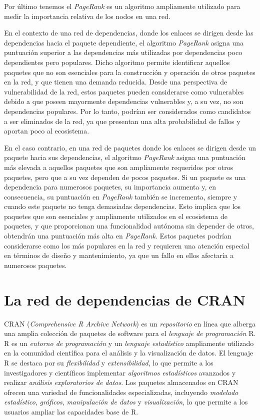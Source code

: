 Por último tenemos el \emph{PageRank} es un algoritmo ampliamente utilizado para medir la importancia relativa
de los nodos en una red.

En el contexto de una red de dependencias, donde los enlaces se dirigen desde las dependencias hacia el paquete
dependiente, el algoritmo \emph{PageRank} asigna una puntuación superior a las dependencias más utilizadas por
dependencias poco dependientes pero populares. Dicho algoritmo permite identificar aquellos paquetes que no son
esenciales para la construcción y operación de otros paquetes en la red, y que tienen una demanda reducida.
Desde una perspectiva de vulnerabilidad de la red, estos paquetes pueden considerarse como vulnerables debido a
que poseen mayormente dependencias vulnerables y, a su vez, no son dependencias populares. Por lo tanto, podrían ser considerados
como candidatos a ser eliminados de la red, ya que presentan una alta probabilidad de fallos y aportan poco al ecosistema.

En el caso contrario, en una red de paquetes donde los enlaces se dirigen desde un paquete hacia sus dependencias,
el algoritmo \emph{PageRank} asigna una puntuación más elevada a aquellos paquetes que son ampliamente requeridos
por otros paquetes, pero que a su vez dependen de pocos paquetes. Si un paquete es una dependencia para numerosos
paquetes, su importancia aumenta y, en consecuencia, su puntuación en \emph{PageRank} también se incrementa, siempre
y cuando este paquete no tenga demasiadas dependencias. Esto implica que los paquetes que son esenciales y ampliamente
utilizados en el ecosistema de paquetes, y que proporcionan una funcionalidad autónoma sin depender de otros,
obtendrán una puntuación más alta en \emph{PageRank}. Estos paquetes podrían considerarse como los más populares
en la red y requieren una atención especial en términos de diseño y mantenimiento, ya que un fallo en ellos afectaría
a numerosos paquetes.

\section{La red de dependencias de CRAN}

CRAN (\textit{Comprehensive R Archive Network}) es un \textit{repositorio} en línea que alberga
una amplia colección de paquetes de software para el \textit{lenguaje de programación} R.
R es un \textit{entorno de programación} y un \textit{lenguaje estadístico} ampliamente
utilizado en la comunidad científica para el análisis y la visualización de datos.
El lenguaje R se destaca por su \textit{flexibilidad} y \textit{extensibilidad},
lo que permite a los investigadores y científicos implementar \textit{algoritmos estadísticos}
avanzados y realizar \textit{análisis exploratorios de datos}.
Los paquetes almacenados en CRAN ofrecen una variedad de funcionalidades especializadas,
incluyendo \textit{modelado estadístico}, \textit{gráficos}, \textit{manipulación de datos}
y \textit{visualización}, lo que permite a los usuarios ampliar las capacidades base de R.


